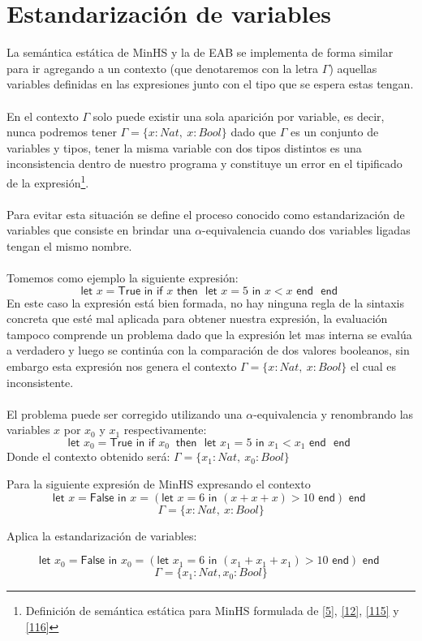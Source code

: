 \section{Estandarización de variables}
La semántica estática de \textsf{MinHS} y la de \textsf{EAB} se implementa de forma similar para ir agregando a un contexto (que denotaremos con la letra $\Gamma$) aquellas variables definidas en las expresiones junto con el tipo que se espera estas tengan.\\\\
En el contexto $\Gamma$ solo puede existir una sola aparición por variable, es decir, nunca podremos tener $\Gamma=\{x : Nat,\ x : Bool\}$ dado que $\Gamma$ es un conjunto de variables y tipos, tener la misma variable con dos tipos distintos es una inconsistencia dentro de nuestro programa y constituye un error en el tipificado de la expresión\footnote{Definición de semántica estática para \textsf{MinHS} formulada de  \hyperlink{5}{[5]},  \hyperlink{12}{[12]}, \hyperlink{115}{[115]} y \hyperlink{116}{[116]}}.\\\\
Para evitar esta situación se define el proceso conocido como estandarización de variables que consiste en brindar una $\alpha$-equivalencia cuando dos variables ligadas tengan el mismo nombre.\\\\
Tomemos como ejemplo la siguiente expresión:
$$ \textsf{let } x = \textsf{True} \textsf{ in } \textsf{if } x \textsf{ then } \textsf{ let } x = 5 \textsf{ in } x < x \textsf{ end } \textsf{ end }$$
En este caso la expresión está bien formada, no hay ninguna regla de la sintaxis concreta que esté mal aplicada para obtener nuestra expresión, la evaluación tampoco comprende un problema dado que la expresión \textsf{let} mas interna se evalúa a verdadero y luego se continúa con la comparación de dos valores booleanos, sin embargo esta expresión nos genera el contexto $\Gamma=\{x : Nat,\ x : Bool\}$ el cual es inconsistente.\\\\
El problema puede ser corregido utilizando una $\alpha$-equivalencia y renombrando las variables $x$ por $x_0$ y $x_1$ respectivamente:
$$ \textsf{let } x_0 = \textsf{True} \textsf{ in } \textsf{if } x_0\ \textsf{ then } \textsf{ let } x_1 = 5 \textsf{ in } x_1 < x_1 \textsf{ end } \textsf{ end }$$
Donde el contexto obtenido será: $\Gamma=\{x_1 : Nat,\ x_0 : Bool\}$

\begin{exercise}
    Para la siguiente expresión de \textsf{MinHS} expresando el contexto
    $$\textsf{let } x = \textsf{False} \textsf{ in } x = (\textsf{let } x = 6 \textsf{ in } (x + x + x) > 10 \textsf{ end}) \textsf{ end }$$
    $$\Gamma=\{x : Nat,\ x : Bool\}$$
    
    Aplica la estandarización de variables:
    
    $$\textsf{let } x_0 = \textsf{False} \textsf{ in } x_0 = (\textsf{let } x_1 = 6 \textsf{ in } (x_1 + x_1 + x_1) > 10 \textsf{ end}) \textsf{ end }$$
    $$\Gamma=\{x_1 : Nat, x_0 : Bool\}$$

\end{exercise} 

